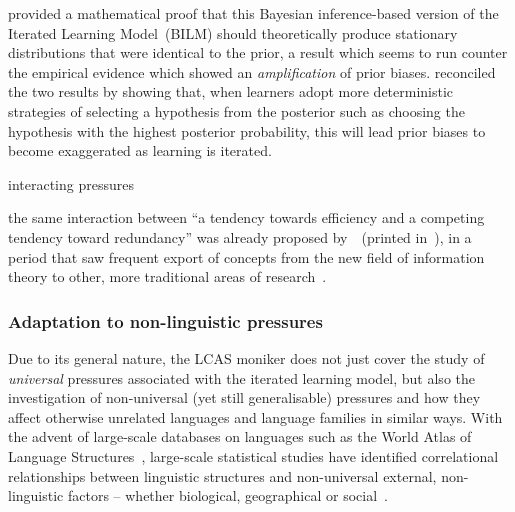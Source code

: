 
\citet{Griffiths2007} provided a mathematical proof that this Bayesian inference-based version of the Iterated Learning Model~(BILM) should theoretically produce stationary distributions that were identical to the prior, a result which seems to run counter the empirical evidence which showed an \emph{amplification} of prior biases. \citet{Kirby2007} reconciled the two results by showing that, when learners adopt more deterministic strategies of selecting a hypothesis from the posterior such as choosing the hypothesis with the highest posterior probability, this will lead prior biases to become exaggerated as learning is iterated.


interacting pressures~\citep{Smith2013,Winter2016}

the same interaction between ``a tendency towards efficiency and a competing tendency toward redundancy'' was already proposed by~\citet[p.155]{Greenberg1954}~(printed in~\citealt{Osgood1954}), in a period that saw frequent export of concepts from the new field of information theory to other, more traditional areas of research~\citep{Shannon1956}.

\subsubsection{Adaptation to non-linguistic pressures}

Due to its general nature, the LCAS moniker does not just cover the study of \emph{universal} pressures associated with the iterated learning model, but also the investigation of non-universal (yet still generalisable) pressures and how they affect otherwise unrelated languages and language families in similar ways.
With the advent of large-scale databases on languages such as the World Atlas of Language Structures~\citep[WALS][]{WALS2013}, large-scale statistical studies have identified correlational relationships between linguistic structures and non-universal external, non-linguistic factors -- whether biological, geographical or social~\citep{Ladd2015}.



